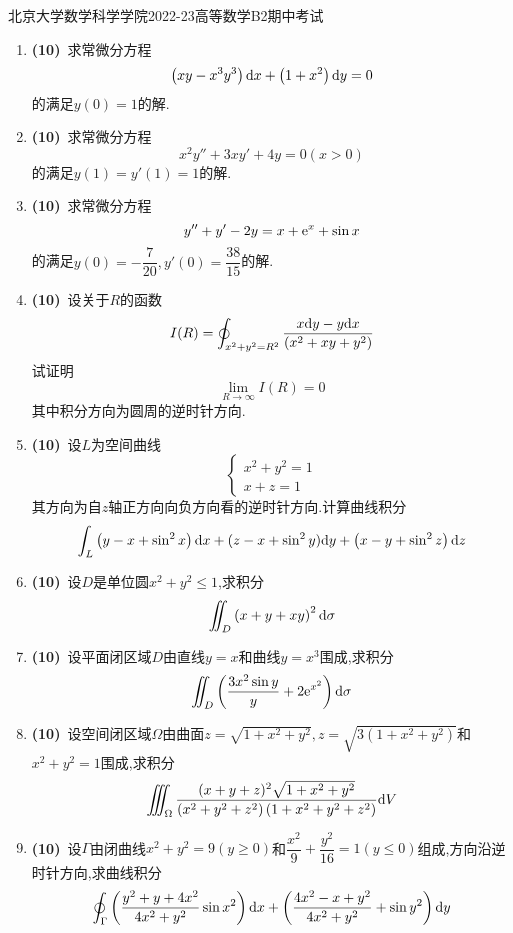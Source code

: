 \documentclass{ctexart}
\begin{document}
\pagestyle{empty}
\begin{center}\Large
    北京大学数学科学学院2022-23高等数学B2期中考试
\end{center}
\begin{enumerate}[leftmargin=*,label=\textbf{\arabic*.}]
    \item \textbf{(10)}\ 求常微分方程
        \[\left(xy-x^3y^3\right)\mathrm{d} x+\left(1+x^2\right)\mathrm{d} y=0\]
        的满足$y(0)=1$的解.
    \item \textbf{(10)}\ 求常微分方程
        \[x^2y''+3xy'+4y=0(x>0)\]
        的满足$y(1)=y'(1)=1$的解.
    \item \textbf{(10)}\ 求常微分方程
        \[y''+y'-2y=x+\mathrm{e}^x+\sin x\]
        的满足$y(0)=-\dfrac{7}{20},y'(0)=\dfrac{38}{15}$的解.
    \item \textbf{(10)}\ 设关于$R$的函数
        \[I(R)=\oint_{x^2+y^2=R^2}\dfrac{x\mathrm{d} y-y\mathrm{d} x}{\left(x^2+xy+y^2\right)}\]
        试证明
        \[\lim_{R\to\infty}I(R)=0\]
        其中积分方向为圆周的逆时针方向.
    \item \textbf{(10)}\ 设$L$为空间曲线
        \[\left\{\begin{array}{l}
            x^2+y^2=1\\
            x+z=1
        \end{array}\right.\]
        其方向为自$z$轴正方向向负方向看的逆时针方向.计算曲线积分
        \[\int_{L}\left(y-x+\sin^2x\right)\mathrm{d} x+(z-x+\sin^2y)\mathrm{d} y+\left(x-y+\sin^2z\right)\mathrm{d} z\]

    \item \textbf{(10)}\ 设$D$是单位圆$x^2+y^2\leqslant1$,求积分
        \[\iint_D\left(x+y+xy\right)^2\mathrm{d}\sigma\]

    \item \textbf{(10)}\ 设平面闭区域$D$由直线$y=x$和曲线$y=x^3$围成,求积分
        \[\iint_D\left(\dfrac{3x^2\sin y}{y}+2\mathrm{e}^{x^2}\right)\mathrm{d}\sigma\]

    \item \textbf{(10)}\ 设空间闭区域$\Omega$由曲面$z=\sqrt{1+x^2+y^2},z=\sqrt{3\left(1+x^2+y^2\right)}$和$x^2+y^2=1$围成,求积分
        \[\iiint_{\Omega}\dfrac{(x+y+z)^2\sqrt{1+x^2+y^2}}{\left(x^2+y^2+z^2\right)\left(1+x^2+y^2+z^2\right)}\mathrm{d} V\]

    \item \textbf{(10)}\ 设$\Gamma$由闭曲线$x^2+y^2=9(y\geqslant0)$和$\dfrac{x^2}{9}+\dfrac{y^2}{16}=1(y\leqslant0)$组成,方向沿逆时针方向,求曲线积分
        \[\oint_{\Gamma}\left(\dfrac{y^2+y+4x^2}{4x^2+y^2}\sin x^2\right)\mathrm{d} x+\left(\dfrac{4x^2-x+y^2}{4x^2+y^2}+\sin y^2\right)\mathrm{d} y\]
    

\end{enumerate}
\end{document}
